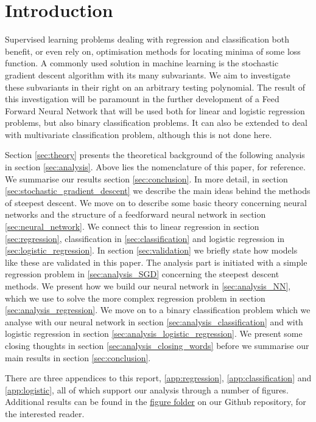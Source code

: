 \section{Introduction}\label{sec:introduction}


Supervised learning problems dealing with regression and classification both benefit, or even rely on, optimisation methods for locating minima of some loss function. A commonly used solution in machine learning is the stochastic gradient descent algorithm with its many subvariants. We aim to investigate these subvariants in their right on an arbitrary testing polynomial. The result of this investigation will be paramount in the further development of a Feed Forward Neural Network that will be used both for linear and logistic regression problems, but also binary classification problems. It can also be extended to deal with multivariate classification problem, although this is not done here. 


Section \ref{sec:theory} presents the theoretical background of the following analysis in section \ref{sec:analysis}. Above lies the nomenclature of this paper, for reference. We summarise our results section \ref{sec:conclusion}. In more detail, in section \ref{sec:stochastic_gradient_descent} we describe the main ideas behind the methods of steepest descent. We move on to describe some basic theory concerning neural networks and the structure of a feedforward neural network in section \ref{sec:neural_network}. We connect this to linear regression in section \ref{sec:regression}, classification in \ref{sec:classification} and logistic regression in \ref{sec:logistic_regression}. In section \ref{sec:validation} we briefly state how models like these are validated in this paper. The analysis part is initiated with a simple regression problem in \ref{sec:analysis_SGD} concerning the steepest descent methods. We present how we build our neural network in \ref{sec:analysis_NN}, which we use to solve the more complex regression problem in section \ref{sec:analysis_regression}. We move on to a binary classification problem which we analyse with our neural network in section \ref{sec:analysis_classification} and with logistic regression in section \ref{sec:analysis_logistic_regression}. We present some closing thoughts in section \ref{sec:analysis_closing_words} before we summarise our main results in section \ref{sec:conclusion}.

There are three appendices to this report, \ref{app:regression}, \ref{app:classification} and \ref{app:logistic}, all of which support our analysis through a number of figures. Additional results can be found in the \href{\figureslink}{figure folder} on our Github repository, for the interested reader.